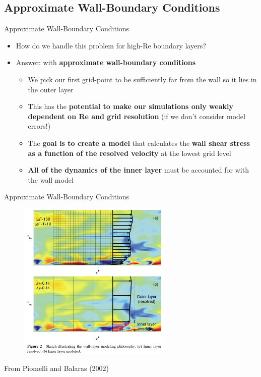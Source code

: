 \subsection{Approximate Wall-Boundary Conditions} %
\begin{frame}{Approximate Wall-Boundary Conditions}
\begin{itemize}
	\item How do we handle this problem for high-Re boundary layers?
	\item Answer: with \textbf{approximate wall-boundary conditions}
	\begin{itemize}
		\item We pick our first grid-point to be sufficiently far from the wall so it lies in the outer layer
		\item This has the \textbf{potential to make our simulations only weakly dependent on Re and grid resolution} (if we don’t consider model errors!)
		\item The \textbf{goal is to create a model} that calculates the \textbf{wall shear stress as a function of the resolved velocity} at the lowest grid level
		\item \textbf{All of the dynamics of the inner layer} must be accounted for with the wall model
	\end{itemize}
\end{itemize}

\end{frame}
\begin{frame}{Approximate Wall-Boundary Conditions}
\begin{figure}
	\includegraphics[width=0.65\textwidth]{sbc2}
\end{figure}
\centering From Piomelli and Balaras (2002)
\end{frame}
